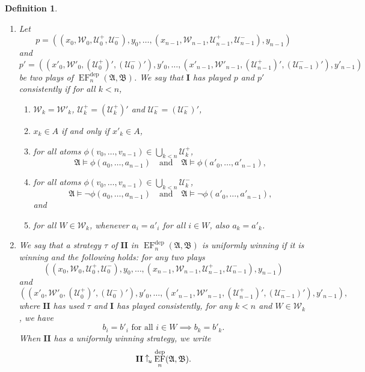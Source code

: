 \documentclass[10pt,a4paper]{amsart}
\newtheorem{definition}{Definition}[section]
\newcommand{\wins}{\mathbin{\raisebox{0.8\depth}{$\uparrow$}}}
\newcommand{\playerone}{\mathrm{\mathbf{I}}}
\newcommand{\playertwo}{\mathrm{\mathbf{II}}}
\DeclareMathOperator{\EF}{EF}
\newcommand{\EFdep}{\EF^{\mathrm{dep}}}
\newcommand{\winsu}{\wins_{\!\textrm u}}
\newcommand{\W}{\mathcal W}
\newcommand{\U}{\mathcal U}
\newcommand{\A}{\mathfrak{A}}
\newcommand{\B}{\mathfrak{B}}
\begin{document}
\begin{definition}\label{Uniform winning strategy}\quad
    \begin{enumerate}
        \item Let
        \[
            p = ((x_0,\W_0,\U^+_0,\U^-_0),y_0,\dots,(x_{n-1},\W_{n-1},\U^+_{n-1},\U^-_{n-1}),y_{n-1})
        \]
        and
        \[
            p' = ((x'_0,\W'_0,(\U^+_0)',(\U^-_0)'),y'_0,\dots,(x'_{n-1},\W'_{n-1},(\U^+_{n-1})',(\U^-_{n-1})'),y'_{n-1})
        \]
        be two plays of $\EFdep_n(\A,\B)$. We say that $\playerone$ has played $p$ and $p'$ \emph{consistently} if for all $k<n$,
        \begin{enumerate}
            \item $\W_k = \W'_k$, $\U^+_k = (\U^+_k)'$ and $\U^-_k = (\U^-_k)'$,
            \item $x_k\in A$ if and only if $x'_k\in A$,
            \item for all atoms $\phi(v_0,\dots,v_{n-1})\in\bigcup_{k<n}\U^+_k$,
            \[
                \A\models\phi(a_0,\dots,a_{n-1}) \quad\text{and}\quad \A\models\phi(a'_0,\dots,a'_{n-1}),
            \]
            \item for all atoms $\phi(v_0,\dots,v_{n-1})\in\bigcup_{k<n}\U^-_k$,
            \[
                \A\models\neg\phi(a_0,\dots,a_{n-1}) \quad\text{and}\quad \A\models\neg\phi(a'_0,\dots,a'_{n-1}),
            \]
            and
            \item for all $W\in\W_k$, whenever $a_i = a'_i$ for all $i\in W$, also $a_k = a'_k$.
        \end{enumerate}
        \item We say that a strategy $\tau$ of $\playertwo$ in $\EFdep_n(\A,\B)$ is \emph{uniformly winning} if it is winning and the following holds: for any two plays
        \[
            ((x_0,\W_0,\U^+_0,\U^-_0),y_0,\dots,(x_{n-1},\W_{n-1},\U^+_{n-1},\U^-_{n-1}),y_{n-1})
        \]
        and
        \[
            ((x'_0,\W'_0,(\U^+_0)',(\U^-_0)'),y'_0,\dots,(x'_{n-1},\W'_{n-1},(\U^+_{n-1})',(\U^-_{n-1})'),y'_{n-1}),
        \]
        where $\playertwo$ has used $\tau$ and $\playerone$ has played consistently, for any $k<n$ and $W\in\W_k$, we have
        \[
            \text{$b_i = b'_i$ for all $i\in W$} \implies b_k = b'_k.
        \]
        When $\playertwo$ has a uniformly winning strategy, we write
        \[
            \playertwo\winsu\EFdep_n(\A,\B).
        \]
    \end{enumerate}
\end{definition}
\end{document}
